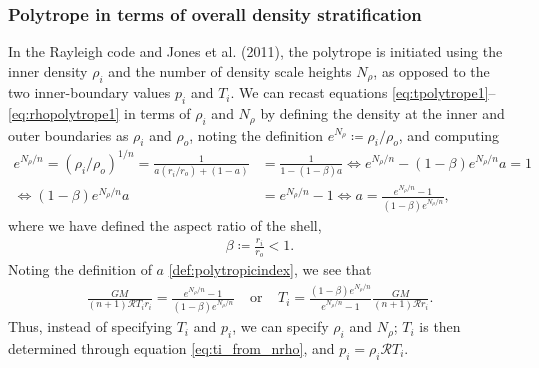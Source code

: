 \documentclass[12pt]{article} %
\newcommand{\orr}{\text{or}\ \ \ \ \ }
\begin{document}
\subsubsection{Polytrope in terms of overall density stratification}
In the Rayleigh code and Jones et al. (2011), the polytrope is initiated using the inner density $\rho_i$ and the number of density scale heights $N_\rho$, as opposed to the two inner-boundary values $p_i$ and $T_i$. We can recast equations \eqref{eq:tpolytrope1}--\eqref{eq:rhopolytrope1} in terms of $\rho_i$ and $N_\rho$ by defining the density at the inner and outer boundaries as $\rho_i$ and $\rho_o$, noting the definition $e^{N_\rho}\coloneqq \rho_i/\rho_o$, and computing
\begin{align*}
e^{N_\rho/n} = (\rho_i/\rho_o)^{1/n} = \frac{1}{a(r_i/r_o) + (1-a)} &= \frac{1}{1 - (1 - \beta)a} \Longleftrightarrow e^{N_\rho/n} - (1-\beta)e^{N_\rho/n}a = 1\\
 \Longleftrightarrow  (1 - \beta)e^{N_\rho/n}a &= e^{N_\rho/n} - 1 \Longleftrightarrow a = \frac{e^{N_\rho/n} - 1 }{(1 - \beta)e^{N_\rho/n}},
\end{align*}
where we have defined the aspect ratio of the shell,
\begin{align}
\beta\coloneqq \frac{r_i}{r_o} < 1.
\label{def:beta}
\end{align}
Noting the definition of $a$ \eqref{def:polytropicindex}, we see that 
\begin{align}
\frac{GM}{(n+1)\mathcal{R}T_i r_i} =  \frac{e^{N_\rho/n} - 1 }{(1 - \beta)e^{N_\rho/n}} \ \ \ \ \ \orr T_i = \frac{(1 - \beta)e^{N_\rho/n}} {e^{N_\rho/n} - 1 }\frac{GM}{(n+1)\mathcal{R} r_i}.
\label{eq:ti_from_nrho}
\end{align}
Thus, instead of specifying $T_i$ and $p_i$, we can specify $\rho_i$ and $N_\rho$; $T_i$ is then determined through equation \eqref{eq:ti_from_nrho}, and $p_i=\rho_i\mathcal{R}T_i$. 
\end{document}
